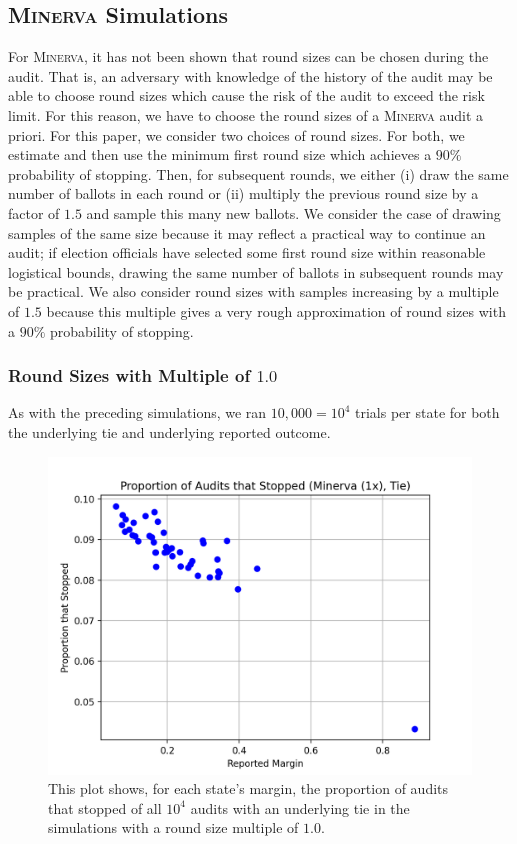 \documentclass[runningheads]{llncs}
\newcommand{\Minerva}{\textsc{Minerva}\xspace}
\begin{document}
\subsection{\Minerva Simulations}
For \Minerva, it has not been shown that round sizes can be chosen
during the audit. That is, an adversary with knowledge of the history
of the audit may be able to choose round sizes which cause the 
risk of the audit to exceed the risk limit.
For this reason, we have to choose the round sizes of a \Minerva 
audit a priori.
For this paper, we consider two choices of round sizes.
For both, we estimate and then use the minimum first round size 
which achieves
a $90\%$ probability of stopping.
Then, for subsequent rounds, we either (i) 
draw the same number of ballots in each round or (ii)
multiply the previous round size by a factor of $1.5$ and 
sample this many new ballots.
We consider the case of drawing samples of the same size
because it may reflect a practical way to continue an
audit; if election officials have selected some first round size within
reasonable logistical bounds, drawing the same number of 
ballots in subsequent rounds may be practical.
We also consider round sizes with samples increasing by a multiple
of $1.5$ because this multiple gives a very rough approximation of 
round sizes with a $90\%$ probability of stopping.

\subsubsection{Round Sizes with Multiple of $1.0$}

As with the preceding simulations, we ran $10,000=10^4$ trials
per state for both the underlying tie and underlying reported
outcome.

\begin{figure}[H]
\includegraphics[width=\textwidth]{minerva_multiround_1x_10^4/total_risk.png}
\caption{This plot shows, for each state's margin, the proportion of audits that stopped of
all $10^4$ audits with an underlying tie in the simulations with a round size multiple of $1.0$.}
\label{fig:minerva1_risk}
\end{figure}
\end{document}

